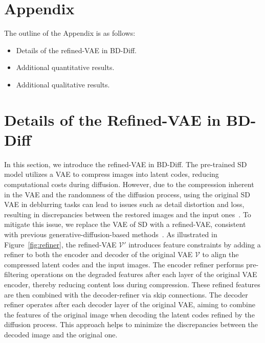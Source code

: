 
\section{Appendix}
The outline of the Appendix is as follows:
 \begin{itemize}
     \item Details of the refined-VAE in BD-Diff.
     \item Additional quantitative results.
     \item Additional qualitative results.
 \end{itemize}


\section{Details of the Refined-VAE in BD-Diff}
\label{appendix: vaerefiner}

In this section, we introduce the refined-VAE in BD-Diff. The pre-trained SD model utilizes a VAE to compress images into latent codes, reducing computational costs during diffusion. However, due to the compression inherent in the VAE and the randomness of the diffusion process, using the original SD VAE in deblurring tasks can lead to issues such as detail distortion and loss, resulting in discrepancies between the restored images and the input ones~\cite{zhu2023designing}. To mitigate this issue, we replace the VAE of SD with a refined-VAE, consistent with previous generative-diffusion-based methods~\cite{zhang2024diff,chen2025unirestore}. As illustrated in Figure~\ref{fig:refiner}, the refined-VAE $\mathcal{V'}$ introduces feature constraints by adding a refiner to both the encoder and decoder of the original VAE $\mathcal{V}$ to align the compressed latent codes and the input images. The encoder refiner performs pre-filtering operations on the degraded features after each layer of the original VAE encoder, thereby reducing content loss during compression. These refined features are then combined with the decoder-refiner via skip connections. The decoder refiner operates after each decoder layer of the original VAE, aiming to combine the features of the original image when decoding the latent codes refined by the diffusion process. This approach helps to minimize the discrepancies between the decoded image and the original one.

